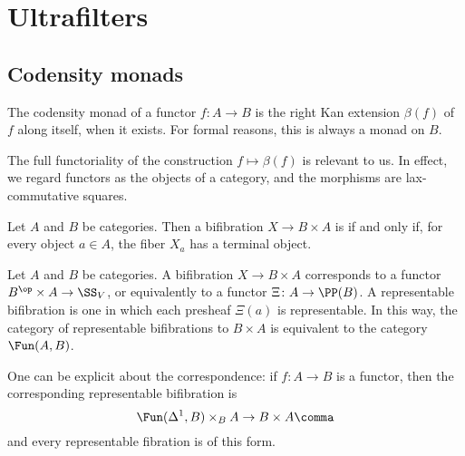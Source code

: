 
\section{Ultrafilters}%
\label{sec:ultrafilters}

\subsection{Codensity monads}%
\label{sub:codensity_monads}

The codensity monad of a functor $ f \colon A \to B $
is the right Kan extension $ \beta(f) $ of $ f $ along itself,
when it exists.
For formal reasons, this is always a monad on $ B $.

The full functoriality
of the construction $ f \mapsto \beta(f) $
is relevant to us.
In effect, we regard functors as the objects of a category,
and the morphisms are lax-commutative squares.


\begin{definition}
	Let $ A $ and $ B $ be categories.
	Then a bifibration 
	\citep[\S\S 2.4.7]{Lurie2009}
	$ X \to B \times A $ is 
	if and only if,
	for every object $ a \in A $,
	the fiber $ X_a $ has a terminal object.
\end{definition}

\begin{nul}
	Let $ A $ and $ B $ be categories.
	A bifibration $ X \to B \times A $ corresponds
	to a functor $ B^{\op} \times A \to \SS_V $,
	or equivalently to a functor $ \Xi \colon A \to \PP(B) $.
	A representable bifibration is one in which
	each presheaf $ \Xi(a) $ is representable.
	In this way,
	the category of representable bifibrations to $ B \times A $
	is equivalent to the category $ \Fun(A, B) $.

	One can be explicit about the correspondence:
	if $ f \colon A \to B $ is a functor,
	then the corresponding representable bifibration is
	\[
		\Fun(\Delta^1, B) \times_B A \to B \times A \comma
	\]
	and every representable fibration is of this form.
\end{nul}

